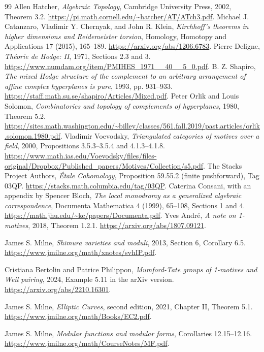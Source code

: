 \documentclass[11pt]{article}
\theoremstyle{definition}
\theoremstyle{remark}
\begin{document}
\begin{thebibliography}{99}
 Allen Hatcher, \emph{Algebraic Topology}, Cambridge University Press, 2002, Theorem 3.2. \url{https://pi.math.cornell.edu/~hatcher/AT/ATch3.pdf}.
 Michael J. Catanzaro, Vladimir Y. Chernyak, and John R. Klein, \emph{Kirchhoff's theorems in higher dimensions and Reidemeister torsion}, Homology, Homotopy and Applications 17 (2015), 165--189. \url{https://arxiv.org/abs/1206.6783}.
 Pierre Deligne, \emph{Th\'eorie de Hodge: II}, 1971, Sections 2.3 and 3. \url{https://www.numdam.org/item/PMIHES_1971__40__5_0.pdf}.
 B. Z. Shapiro, \emph{The mixed Hodge structure of the complement to an arbitrary arrangement of affine complex hyperplanes is pure}, 1993, pp. 931--933. \url{https://staff.math.su.se/shapiro/Articles/Mixed.pdf}.
 Peter Orlik and Louis Solomon, \emph{Combinatorics and topology of complements of hyperplanes}, 1980, Theorem 5.2. \url{https://sites.math.washington.edu/~billey/classes/561.fall.2019/past.articles/orlik.solomon.1980.pdf}.
 Vladimir Voevodsky, \emph{Triangulated categories of motives over a field}, 2000, Propositions 3.5.3--3.5.4 and 4.1.3--4.1.8. \url{https://www.math.ias.edu/Voevodsky/files/files-original/Dropbox/Published_papers/Motives/Collection/s5.pdf}.
 The Stacks Project Authors, \emph{\'{E}tale Cohomology}, Proposition 59.55.2 (finite pushforward), Tag 03QP. \url{https://stacks.math.columbia.edu/tag/03QP}.
 Caterina Consani, with an appendix by Spencer Bloch, \emph{The local monodromy as a generalized algebraic correspondence}, Documenta Mathematica 4 (1999), 65--108, Sections 1 and 4. \url{https://math.jhu.edu/~kc/papers/Documenta.pdf}.
 Yves Andr\'e, \emph{A note on 1-motives}, 2018, Theorem 1.2.1. \url{https://arxiv.org/abs/1807.09121}.

 James S. Milne, \emph{Shimura varieties and moduli}, 2013, Section 6, Corollary 6.5. \url{https://www.jmilne.org/math/xnotes/svhIP.pdf}.

 Cristiana Bertolin and Patrice Philippon, \emph{Mumford-Tate groups of 1-motives and Weil pairing}, 2024, Example 5.11 in the arXiv version. \url{https://arxiv.org/abs/2210.16301}.

 James S. Milne, \emph{Elliptic Curves}, second edition, 2021, Chapter II, Theorem 5.1. \url{https://www.jmilne.org/math/Books/EC2.pdf}.

 James S. Milne, \emph{Modular functions and modular forms}, Corollaries 12.15--12.16. \url{https://www.jmilne.org/math/CourseNotes/MF.pdf}.
\end{thebibliography}
\end{document}
